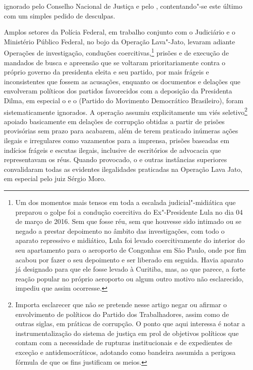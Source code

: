 ignorado pelo Conselho Nacional de Justiça e pelo , contentando"-se
este último com um simples pedido de desculpas.

Amplos setores da Polícia Federal, em trabalho conjunto com o Judiciário
e o Ministério Público Federal, no bojo da Operação Lava"-Jato, levaram
adiante Operações de investigação, conduções coercitivas,\footnote{Um dos
  momentos mais tensos em toda a escalada judicial"-midiática que
  preparou o golpe foi a condução coercitiva do Ex"-Presidente Lula no
  dia 04 de março de 2016. Sem que fosse réu, sem que houvesse sido
  intimado ou se negado a prestar depoimento no âmbito das
  investigações, com todo o aparato repressivo e midiático, Lula foi
  levado coercitivamente do interior do seu apartamento para o aeroporto
  de Congonhas em São Paulo, onde por fim acabou por fazer o seu
  depoimento e ser liberado em seguida. Havia aparato já designado para
  que ele fosse levado à Curitiba, mas, ao que parece, a forte reação
  popular no próprio aeroporto ou algum outro motivo não esclarecido,
  impediu que assim ocorresse.} prisões e de execução de mandados de
busca e apreensão que se voltaram prioritariamente contra o próprio
governo da presidenta eleita e seu partido, por mais frágeis e
inconsistentes que fossem as acusações, enquanto os documentos e
delações que envolveram políticos dos partidos favorecidos com a
deposição da Presidenta Dilma, em especial o  e o  (Partido do
Movimento Democrático Brasileiro), foram sistematicamente ignorados. A
operação assumiu explicitamente um viés seletivo\footnote{Importa
  esclarecer que não se pretende nesse artigo negar ou afirmar o
  envolvimento de políticos do Partido dos Trabalhadores, assim como de
  outras siglas, em práticas de corrupção. O ponto que aqui interessa é
  notar a instrumentalização do sistema de justiça em prol de objetivos
  políticos que contam com a necessidade de rupturas institucionais e de
  expedientes de exceção e antidemocráticos, adotando como bandeira
  assumida a perigosa fórmula de que os fins justificam os meios.}
apoiado basicamente em delações de corrupção obtidas a partir de prisões
provisórias sem prazo para acabarem, além de terem praticado inúmeras
ações ilegais e irregulares como vazamentos para a imprensa, prisões
baseadas em indícios frágeis e escutas ilegais, inclusive de escritórios
de advocacia que representavam os réus.
Quando provocado, o  e outras instâncias superiores
convalidaram todas as evidentes ilegalidades praticadas na Operação
Lava Jato, em especial pelo juiz Sérgio Moro.


